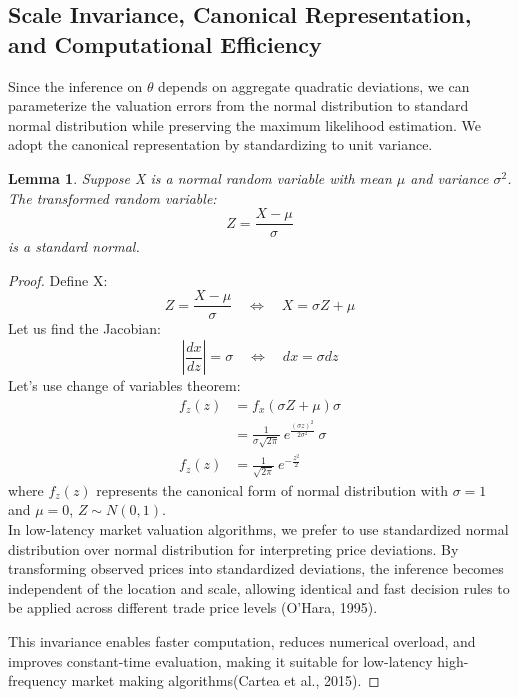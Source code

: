 \documentclass[12pt]{article}
\theoremstyle{plain}
\newtheorem{lemma}[theorem]{Lemma}
\theoremstyle{definition}
\numberwithin{equation}{section}
\begin{document}
\subsection{Scale Invariance, Canonical Representation, and Computational Efficiency}
Since the inference on $\theta$ depends on aggregate quadratic deviations, we can parameterize the valuation errors from the normal distribution to standard normal distribution while preserving the maximum likelihood estimation. We adopt the canonical representation by standardizing to unit variance.
\begin{lemma}
Suppose X is a normal random variable with mean $\mu$ and variance $\sigma^2$. The transformed random variable: 
\begin{equation}
Z = \frac{X- \mu} {\sigma}
\end{equation}
is a standard normal.
\end{lemma}
\begin{proof}
Define X:
\begin{equation}
Z = \frac{X- \mu} {\sigma} \quad \Leftrightarrow \quad X = \sigma Z + \mu
\end{equation}
Let us find the Jacobian: 
\begin{equation}
\left|\frac{dx}{dz}\right| = \sigma \quad \Leftrightarrow \quad  dx = \sigma dz
\end{equation}
Let's use change of variables theorem: 
\begin{align}
f_z (z) &= f_x(\sigma Z + \mu) \sigma \\
&= \frac{1}{\sigma\sqrt{2\pi}} \ e^{\frac{(\sigma z )^2}{2\sigma^2}} \ \sigma \\
f_z(z) &= \frac{1}{\sqrt{2\pi}} \ e^{-\frac{z^2}{2}} \quad
\end{align}
where $f_z(z)$ represents the canonical form of normal distribution with $\sigma = 1$ and $ \mu = 0$, $Z \sim N(0, 1)$. \\ 
In low-latency market valuation algorithms, we prefer to use standardized normal distribution over normal distribution for interpreting price deviations. By transforming observed prices into standardized deviations, the inference becomes independent of the location and scale, allowing identical and fast decision rules to be applied across different trade price levels (O'Hara, 1995). 

This invariance enables faster computation, reduces numerical overload, and improves constant-time evaluation, making it suitable for low-latency high-frequency market making algorithms(Cartea et al., 2015).
\end{proof}
\end{document}
